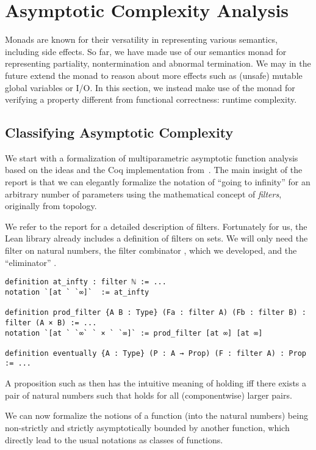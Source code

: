 \section{Asymptotic Complexity Analysis}
\label{sec:asymptotic}

Monads are known for their versatility in representing various semantics,
including side effects. So far, we have made use of our semantics monad for
representing partiality, \ie nontermination and abnormal termination. We may in
the future extend the monad to reason about more effects such as (unsafe) mutable global
variables or I/O. In this section, we instead make use of the monad for verifying a
property different from functional correctness: runtime complexity.

\subsection{Classifying Asymptotic Complexity}

We start with a formalization of multiparametric asymptotic function analysis
based on the ideas and the Coq implementation from~\cite{gueneau}. The main insight of the report is that
we can elegantly formalize the notation of ``going to infinity'' for an
arbitrary number of parameters using the mathematical concept of \emph{filters},
originally from topology.

We refer to the report for a detailed description of
filters. Fortunately for us, the Lean library already includes
a definition of filters on sets. We will only need the filter  on
natural numbers, the filter combinator , which we developed,
and the ``eliminator'' .

\begin{verbatim}
definition at_infty : filter ℕ := ...
notation `[at ` `∞]`  := at_infty

definition prod_filter {A B : Type} (Fa : filter A) (Fb : filter B) : filter (A × B) := ...
notation `[at ` `∞` ` × ` `∞]` := prod_filter [at ∞] [at ∞]

definition eventually {A : Type} (P : A → Prop) (F : filter A) : Prop := ...
\end{verbatim}

A proposition such as  then has the intuitive meaning
of holding iff there exists a pair of natural numbers such that  holds
for all (componentwise) larger pairs.

We can now formalize the notions of a function (into the natural numbers) being non-strictly and strictly
asymptotically bounded by another function, which directly lead to the usual
notations as classes of functions.

